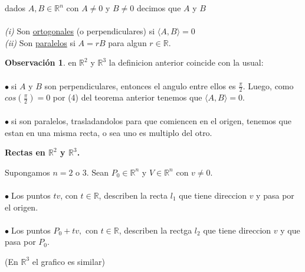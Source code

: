 \documentclass{article}
\theoremstyle{definition}
\newtheorem*{obs}{Observación}
\theoremstyle{remark}
\newcommand\bl{$\bullet\;$}
\begin{document}
\begin{defi}
  dados $A,B \in \mathbb{R}^n$ con $A \neq 0$ y $B \neq 0$ decimos que $A$ y $B$ \\\\
  \emph{(i\phantom{i})} \quad Son \underline{ortogonales} (o perpendiculares) si $\langle A,B \rangle = 0$ \\
  \emph{(ii)} \quad Son \underline{paralelos} si $A=rB$ para algun $r \in \mathbb{R}$.
\end{defi}
\begin{obs}
  en $\mathbb{R}^2$ y $\mathbb{R}^3$ la definicion anterior coincide con la usual: \\\\
  \bl si $A$ y $B$ son perpendiculares, entonces el angulo entre ellos es $\frac{\pi}{2}$. Luego, como $cos(\frac{\pi}{2})=0$ por (4) del teorema anterior tenemos que $\langle A,B \rangle = 0$. \\\\ 
  \bl si son paralelos, trasladandolos para que comiencen en el origen, tenemos que estan en una misma recta, o sea uno es multiplo del otro.
\end{obs}

\begin{figure}[h]
\centering
\def\svgwidth{0.75\textwidth}

\end{figure}

\pagebreak

\begin{center}
  \textbf{Rectas en $\mathbb{R}^2$ y $\mathbb{R}^3$.}
\end{center}
Supongamos $n=2$ o $3$. Sean $P_0 \in \mathbb{R}^n$ y $V \in \mathbb{R}^n$ con $v \neq 0$. \\ \\
\bl Los puntos $tv$, con $t \in \mathbb{R}$, describen la recta $l_1$ que tiene direccion $v$ y pasa por el origen. \\\\
\bl Los puntos $P_0 + tv,$ con $t \in \mathbb{R}$, describen la rectga $l_2$ que tiene direccion $v$ y que pasa por $P_0$.

\begin{figure}[h]
\centering
\def\svgwidth{0.75\textwidth}

\end{figure}

(En $\mathbb{R}^3$ el grafico es similar)
\end{document}
